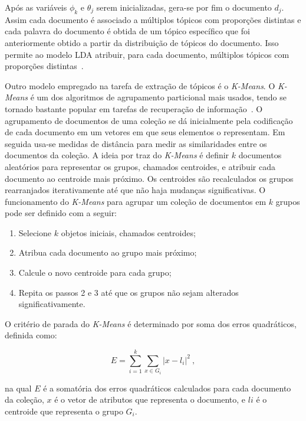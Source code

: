 Após as variáveis $\phi_k$ e $\theta_j$ serem inicializadas, gera-se por fim o documento $d_j$.
%
Assim cada documento é associado a múltiplos tópicos com proporções distintas e cada palavra do documento é obtida de um tópico específico que foi anteriormente obtido a partir da distribuição de tópicos do documento. Isso permite ao modelo LDA atribuir, para cada documento, múltiplos tópicos com proporções distintas~\cite{Blei2012, Faleiros2016}.









Outro modelo empregado na tarefa de extração de tópicos é o \textit{K-Means}. O \textit{K-Means} é um dos algoritmos de agrupamento particional mais usados, tendo se tornado bastante popular em tarefas de recuperação de informação~\cite{Manning2008}. O agrupamento de documentos de uma coleção se dá inicialmente pela codificação de cada documento em um vetores em que seus elementos o representam. Em seguida usa-se medidas de distância para medir as similaridades entre os documentos da coleção.
A ideia por traz do \textit{K-Means} é definir $k$ documentos aleatórios para representar os grupos, chamados centroides, e atribuir cada documento ao centroide mais próximo. Os centroides são recalculados os grupos rearranjados iterativamente até que não haja mudanças significativas.
O funcionamento do \textit{K-Means} para agrupar um coleção de documentos em $k$ grupos pode ser definido com a seguir:
\begin{enumerate}
	\item Selecione $k$ objetos iniciais, chamados centroides;
	\item Atribua cada documento ao grupo mais próximo;
	\item Calcule o novo centroide para cada grupo;
	\item Repita os passos 2 e 3 até que os grupos não sejam alterados significativamente.
\end{enumerate}

O critério de parada do \textit{K-Means} é determinado por soma dos erros quadráticos, definida como:

\begin{equation}
	E = \sum_{i=1}^k    \sum_{x \in G_i}     |x - l_i |^2~,
\end{equation}

\noindent
na qual $E$ é a somatória dos erros quadráticos calculados para cada documento da coleção, $x$ é o vetor de atributos que representa o documento, e $li$ é o centroide que representa o grupo $G_i$.

